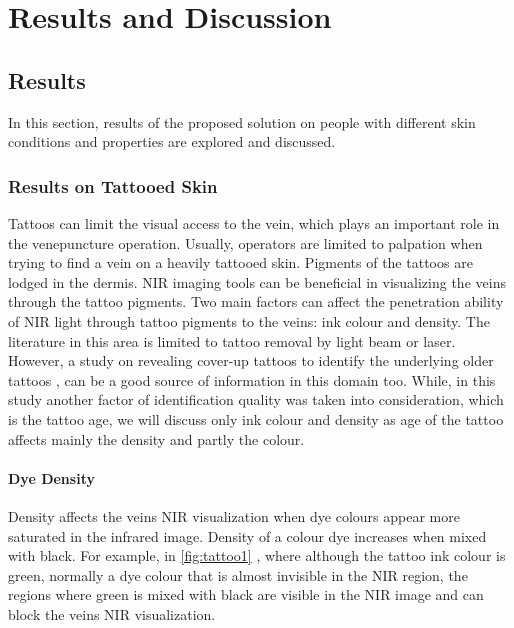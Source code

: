 
\chapter{Results and Discussion}\label{Results and Discussion}


\section{Results}
In this section, results of the proposed solution on people with different skin conditions and properties are explored and discussed.
\subsection{Results on Tattooed Skin}
Tattoos can limit the visual access to the vein, which plays an important role in the venepuncture operation. Usually, operators are limited to palpation when trying to find a vein on a heavily  tattooed skin. Pigments of the tattoos are lodged in the dermis. NIR imaging tools can be beneficial in visualizing the veins through the tattoo pigments. 
Two main factors can affect the penetration ability of NIR light through tattoo pigments to the veins: ink colour and density.
The literature in this area is limited to tattoo removal by light beam or laser. However, a study on revealing cover-up tattoos to identify the underlying older tattoos \parencite{tatto}, can be a good source of information in this domain too. While, in this study another factor of identification quality was taken into consideration, which is the tattoo age, we will discuss only ink colour and density as age of the tattoo affects mainly the density and partly the colour.

\subsubsection{Dye Density}

Density affects the veins NIR visualization when dye colours appear more saturated in the infrared image. Density of a colour dye increases when mixed with black. For example, in \autoref{fig:tattoo1} \parencite{tatto}, where although the tattoo ink colour is green, normally a dye colour that is almost invisible in the NIR region, the regions where green is mixed with black are visible in the NIR image and can block the veins NIR visualization. 


